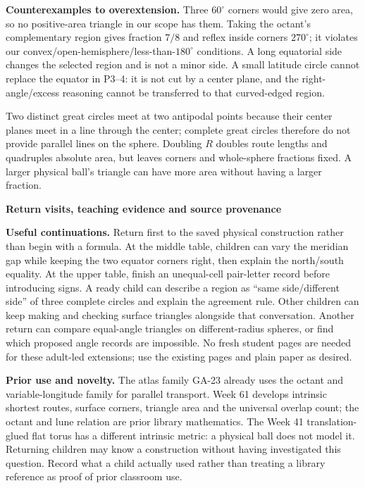 \documentclass[11pt,letterpaper]{article}
\newcommand{\topic}[1]{\par{\large\bfseries\color{blue}#1}\par}
\newcommand{\degc}{^\circ}
\begin{document}
\textbf{Counterexamples to overextension.} Three $60\degc$ corners would give zero area, so no positive-area triangle in our scope has them. Taking the octant's complementary region gives fraction $7/8$ and reflex inside corners $270\degc$; it violates our convex/open-hemisphere/less-than-$180\degc$ conditions. A long equatorial side changes the selected region and is not a minor side. A small latitude circle cannot replace the equator in P3--4: it is not cut by a center plane, and the right-angle/excess reasoning cannot be transferred to that curved-edged region.

Two distinct great circles meet at two antipodal points because their center planes meet in a line through the center; complete great circles therefore do not provide parallel lines on the sphere. Doubling $R$ doubles route lengths and quadruples absolute area, but leaves corners and whole-sphere fractions fixed. A larger physical ball's triangle can have more area without having a larger fraction.

\newpage
\topic{Return visits, teaching evidence and source provenance}
\textbf{Useful continuations.} Return first to the saved physical construction rather than begin with a formula. At the middle table, children can vary the meridian gap while keeping the two equator corners right, then explain the north/south equality. At the upper table, finish an unequal-cell pair-letter record before introducing signs. A ready child can describe a region as ``same side/different side'' of three complete circles and explain the agreement rule. Other children can keep making and checking surface triangles alongside that conversation. Another return can compare equal-angle triangles on different-radius spheres, or find which proposed angle records are impossible. No fresh student pages are needed for these adult-led extensions; use the existing pages and plain paper as desired.

\textbf{Prior use and novelty.} The atlas family GA-23 already uses the octant and variable-longitude family for parallel transport. Week 61 develops intrinsic shortest routes, surface corners, triangle area and the universal overlap count; the octant and lune relation are prior library mathematics. The Week 41 translation-glued flat torus has a different intrinsic metric: a physical ball does not model it. Returning children may know a construction without having investigated this question. Record what a child actually used rather than treating a library reference as proof of prior classroom use.
\end{document}
